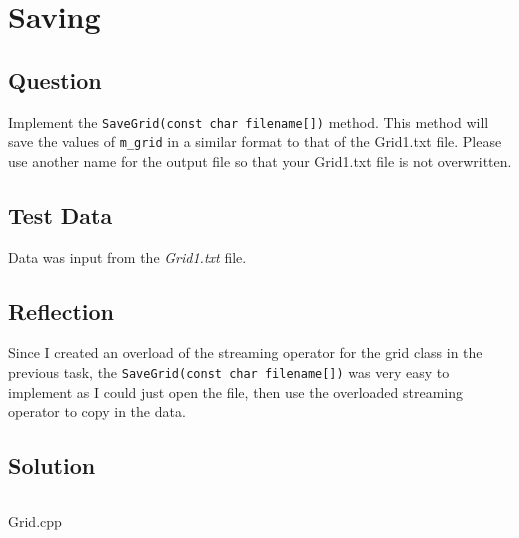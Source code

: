 \section{Saving}
    \subsection*{Question}
        Implement the \texttt{SaveGrid(const char filename[])} method. 
        This method will save the values of \texttt{m_grid} in a similar 
        format to that of the Grid1.txt file. 
        Please use another name for the output file 
        so that your Grid1.txt file is not overwritten.

    \subsection*{Test Data}
        Data was input from the \textit{Grid1.txt} file.

    \subsection*{Reflection}
        Since I created an overload of the streaming operator for the grid class 
        in the previous task, the \texttt{SaveGrid(const char filename[])} was very easy
        to implement as I could just open the file, then use the overloaded streaming operator to copy
        in the data.

    \subsection*{Solution}
        \begin{listing}[H]
            \inputminted[firstline=47, lastline=60]{cpp}{../Tasks/03-Saving/Grid.cpp}
            \caption{Grid.cpp}
        \end{listing}